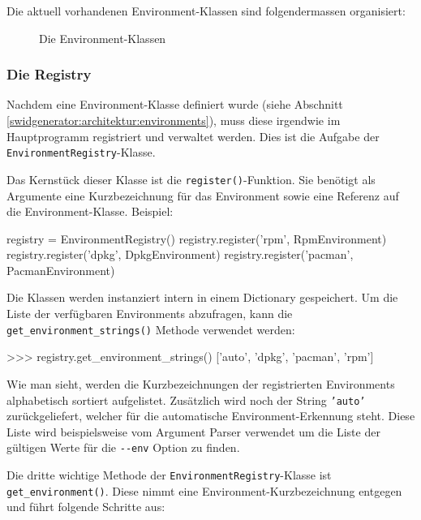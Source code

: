 Die aktuell vorhandenen Environment-Klassen sind folgendermassen organisiert:

\begin{figure}[H]
	\centering
	\resizebox{\textwidth}{!}{%
		
	}
	\caption{Die Environment-Klassen}
	\label{img:environment-klassendiagramm}
\end{figure}


\subsubsection{Die Registry}
\label{swidgenerator:architektur:environments:registry}

Nachdem eine Environment-Klasse definiert wurde (siehe Abschnitt
\ref{swidgenerator:architektur:environments}), muss diese irgendwie im
Hauptprogramm registriert und verwaltet werden. Dies ist die Aufgabe der
\texttt{EnvironmentRegistry}-Klasse.

Das Kernstück dieser Klasse ist die \texttt{register()}-Funktion. Sie benötigt als
Argumente eine Kurzbezeichnung für das Environment sowie eine Referenz auf die
Environment-Klasse. Beispiel:

\begin{pythoncode}
registry = EnvironmentRegistry()
registry.register('rpm', RpmEnvironment)
registry.register('dpkg', DpkgEnvironment)
registry.register('pacman', PacmanEnvironment)
\end{pythoncode}

Die Klassen werden instanziert intern in einem Dictionary gespeichert. Um die
Liste der verfügbaren Environments abzufragen, kann die
\texttt{get\_environment\_strings()} Methode verwendet werden:

\begin{pythoncode}
>>> registry.get_environment_strings()
['auto', 'dpkg', 'pacman', 'rpm']
\end{pythoncode}

Wie man sieht, werden die Kurzbezeichnungen der registrierten Environments
alphabetisch sortiert aufgelistet. Zusätzlich wird noch der String
\texttt{'auto'} zurückgeliefert, welcher für die automatische
Environment-Erkennung steht. Diese Liste wird beispielsweise vom Argument Parser
verwendet um die Liste der gültigen Werte für die \texttt{-{}-env} Option zu
finden.

Die dritte wichtige Methode der \texttt{EnvironmentRegistry}-Klasse ist
\texttt{get\_environment()}. Diese nimmt eine Environment-Kurzbezeichnung
entgegen und führt folgende Schritte aus:

